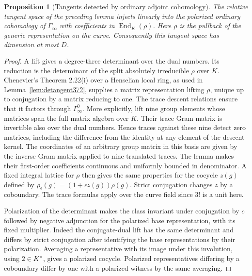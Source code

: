 \documentclass[a4paper,11pt]{article}
\newtheorem{proposition}{Proposition}[section]
\theoremstyle{definition}
\theoremstyle{remark}
\numberwithin{equation}{section}
\begin{document}
\begin{proposition}[Tangents detected by ordinary adjoint cohomology]\leavevmode
\label{prop:tangentcurve409}
The relative tangent space of the preceding lemma injects
linearly into the polarized ordinary cohomology of
\(\Gamma_\infty\) with coefficients in
\(\operatorname{End}_K(\rho)\). Here \(\rho\) is the pullback
of the generic representation on the curve. Consequently
this tangent space has dimension at most \(D\).
\end{proposition}
\begin{proof}
A lift gives a degree-three determinant over the dual numbers.
Its reduction is the determinant of the split absolutely
irreducible \(\rho\) over \(K\). Chenevier's Theorem 2.22(i)
over a Henselian local ring, as used in
Lemma~\ref{lem:detangent372}, supplies a matrix representation
lifting \(\rho\), unique up to conjugation by a matrix
reducing to one. The trace descent relations ensure that it
factors through \(\Gamma_\infty^0\). More explicitly, lift
nine group elements whose matrices span the full matrix
algebra over \(K\). Their trace Gram matrix is invertible
also over the dual numbers. Hence traces against these nine
detect zero matrices, including the difference from the
identity at any element of the descent kernel. The
coordinates of an arbitrary group matrix in this basis
are given by the inverse Gram matrix applied to nine
translated traces. The lemma makes their first-order
coefficients continuous and uniformly bounded in
denominator. A fixed integral lattice for \(\rho\) then
gives the same properties for the cocycle \(z(g)\) defined
by \(\rho_\epsilon(g)=(1+\epsilon z(g))\rho(g)\).
Strict conjugation changes \(z\) by a coboundary. The trace formulas apply over the curve field since \(3!\) is a unit here.
\cite{VIII-VI-chenevier364}

Polarization of the determinant makes the class invariant
under conjugation by \(c\) followed by negative adjunction
for the polarized base representation, with its fixed
multiplier. Indeed the conjugate-dual lift has the same
determinant and differs by strict conjugation after
identifying the base representations by their polarization.
Averaging a representative with its image under this
involution, using \(2\in K^\times\), gives a polarized
cocycle. Polarized representatives differing by a
coboundary differ by one with a polarized witness by the
same averaging.


\end{proof}
\end{document}
